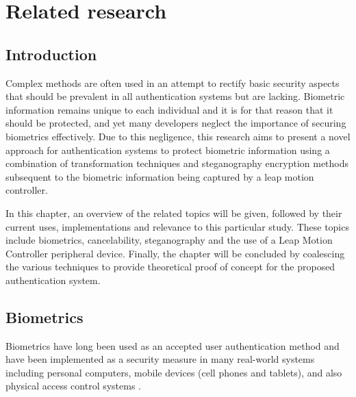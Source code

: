 
\chapter{Related research}



\section[Introduction]{Introduction}
Complex methods are often used in an attempt to rectify basic security aspects that should be prevalent in all authentication systems but are lacking. Biometric information remains unique to each individual and it is for that reason that it should be protected, and yet many developers neglect the importance of securing biometrics effectively. Due to this negligence, this research aims to present a novel approach for authentication systems to protect biometric information using a combination of transformation techniques and steganography encryption methods subsequent to the biometric information being captured by a leap motion controller. 

In this chapter, an overview of the related topics will be given, followed by their current uses, implementations and relevance to this particular study. These topics include biometrics, cancelability, steganography and the use of a Leap Motion Controller peripheral device. Finally, the chapter will be concluded by coalescing the various techniques to provide theoretical proof of concept for the proposed authentication system.


\section[Biometrics]{Biometrics}
Biometrics have long been used as an accepted user authentication method and have been implemented as a security measure in many real-world systems including personal computers, mobile devices (cell phones and tablets), and also physical access control systems \citep{Shahim2016}.


